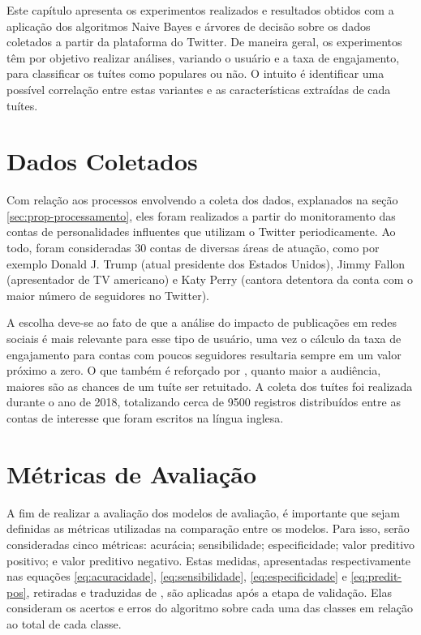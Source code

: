 \documentclass[oneside,openright,12pt]{ufsm_2015} %
\begin{document}
    \par Este capítulo apresenta os experimentos realizados e resultados obtidos com a aplicação dos algoritmos Naive Bayes e árvores de decisão sobre os dados coletados a partir da plataforma do Twitter. De maneira geral, os experimentos têm por objetivo realizar análises, variando o usuário e a taxa de engajamento, para classificar os tuítes como populares ou não. O intuito é identificar uma possível correlação entre estas variantes e as características extraídas de cada tuítes.


\section{Dados Coletados}
\label{sec:exp-dados-coletados}

    \par Com relação aos processos envolvendo a coleta dos dados, explanados na seção \ref{sec:prop-processamento}, eles foram realizados a partir do monitoramento das contas de personalidades influentes que utilizam o Twitter periodicamente. Ao todo, foram consideradas 30 contas de diversas áreas de atuação, como por exemplo Donald J. Trump (atual presidente dos Estados Unidos), Jimmy Fallon (apresentador de TV americano) e Katy Perry (cantora detentora da conta com o maior número de seguidores no Twitter).
    
    \par A escolha deve-se ao fato de que a análise do impacto de publicações em redes sociais é mais relevante para esse tipo de usuário, uma vez o cálculo da taxa de engajamento para contas com poucos seguidores resultaria sempre em um valor próximo a zero. O que também é reforçado por \cite{ieee:suh:10}, quanto maior a audiência, maiores são as chances de um tuíte ser retuitado. A coleta dos tuítes foi realizada durante o ano de 2018, totalizando cerca de 9500 registros distribuídos entre as contas de interesse que foram escritos na língua inglesa.
    

\section{Métricas de Avaliação}
\label{sec:exp-class-metricas}

    \par A fim de realizar a avaliação dos modelos de avaliação, é importante que sejam definidas as métricas utilizadas na comparação entre os modelos. Para isso, serão consideradas cinco métricas: acurácia; sensibilidade; especificidade; valor preditivo positivo; e valor preditivo negativo. Estas medidas, apresentadas respectivamente nas equações \ref{eq:acuracidade}, \ref{eq:sensibilidade}, \ref{eq:especificidade} e \ref{eq:predit-pos}, retiradas e traduzidas de \cite{book:han:11}, são aplicadas após a etapa de validação. Elas consideram os acertos e erros do algoritmo sobre cada uma das classes em relação ao total de cada classe.
    
\end{document}
